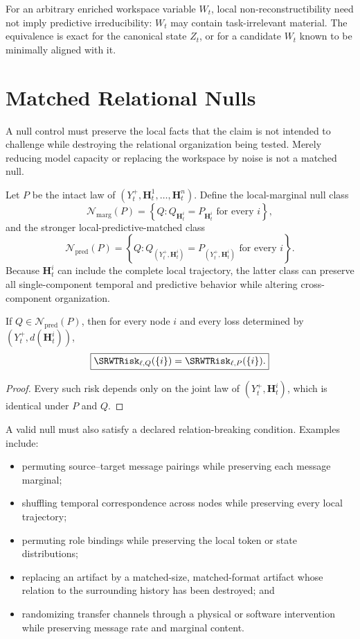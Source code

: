 For an arbitrary enriched workspace variable \(W_t\), local
non-reconstructibility need not imply predictive irreducibility: \(W_t\) may
contain task-irrelevant material. The equivalence is exact for the canonical
state \(Z_t\), or for a candidate \(W_t\) known to be minimally aligned with
it.

\section{Matched Relational Nulls}

A null control must preserve the local facts that the claim is not intended to
challenge while destroying the relational organization being tested. Merely
reducing model capacity or replacing the workspace by noise is not a matched
null.

Let \(P\) be the intact law of
\((Y_t^+,\mathbf H_t^1,\ldots,\mathbf H_t^n)\). Define the local-marginal null
class
\[
\mathcal N_{\mathrm{marg}}(P)
=
\left\{
Q:
Q_{\mathbf H_t^i}=P_{\mathbf H_t^i}
\text{ for every }i
\right\},
\]
and the stronger local-predictive-matched class
\[
\boxed{
\mathcal N_{\mathrm{pred}}(P)
=
\left\{
Q:
Q_{(Y_t^+,\mathbf H_t^i)}
=
P_{(Y_t^+,\mathbf H_t^i)}
\text{ for every }i
\right\}.
}
\]
Because \(\mathbf H_t^i\) can include the complete local trajectory, the latter
class can preserve all single-component temporal and predictive behavior while
altering cross-component organization.

\begin{SRWTproposition}
\label{SRWT:prop:local-risk-null}
If \(Q\in\mathcal N_{\mathrm{pred}}(P)\), then for every node \(i\) and every
loss determined by \((Y_t^+,d(\mathbf H_t^i))\),
\[
\boxed{
\SRWTRisk_{\ell,Q}(\{i\})
=
\SRWTRisk_{\ell,P}(\{i\}).
}
\]
\end{SRWTproposition}

\begin{proof}
Every such risk depends only on the joint law of
\((Y_t^+,\mathbf H_t^i)\), which is identical under \(P\) and \(Q\).
\end{proof}

A valid null must also satisfy a declared relation-breaking condition. Examples
include:
\begin{itemize}
\item permuting source--target message pairings while preserving each message
 marginal;
\item shuffling temporal correspondence across nodes while preserving every
 local trajectory;
\item permuting role bindings while preserving the local token or state
 distributions;
\item replacing an artifact by a matched-size, matched-format artifact whose
 relation to the surrounding history has been destroyed; and
\item randomizing transfer channels through a physical or software
 intervention while preserving message rate and marginal content.
\end{itemize}

